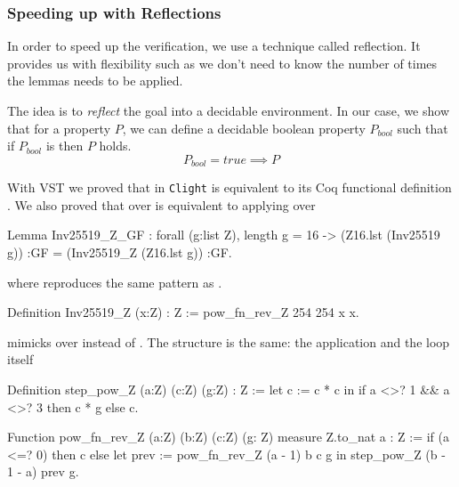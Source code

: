 \subsubsection{Speeding up with Reflections}

In order to speed up the verification, we use a technique called reflection.
It provides us with flexibility such as we don't need to know the  number of
times the lemmas needs to be applied.

The idea is to \textit{reflect} the goal into a decidable environment.
In our case, we show that for a property $P$, we can define a decidable
boolean property $P_{bool}$ such that if $P_{bool}$ is  then $P$ holds.
$$P_{bool} = true \implies P$$

With VST we proved that  in \texttt{Clight} is equivalent to its Coq
functional definition . We also proved that 
over  is equivalent to applying
 over 


\begin{Coq}
Lemma Inv25519_Z_GF :
  forall (g:list Z),
  length g = 16 ->
  (Z16.lst (Inv25519 g)) :GF =
  (Inv25519_Z (Z16.lst g)) :GF.
\end{Coq}


where  reproduces the same pattern as .

\begin{Coq}
Definition Inv25519_Z (x:Z) : Z :=
  pow_fn_rev_Z 254 254 x x.
\end{Coq}

 mimicks  over  instead of
. The structure is the same:
the application  and the loop itself 

\begin{Coq}
Definition step_pow_Z (a:Z) (c:Z) (g:Z) : Z :=
  let c := c * c in
  if a <>? 1 && a <>? 3
    then c * g
    else c.

Function pow_fn_rev_Z (a:Z) (b:Z) (c:Z) (g: Z)
  {measure Z.to_nat a} : Z :=
  if (a <=? 0)
    then c
    else
      let prev := pow_fn_rev_Z (a - 1) b c g in
        step_pow_Z (b - 1 - a) prev g.
\end{Coq}
%

